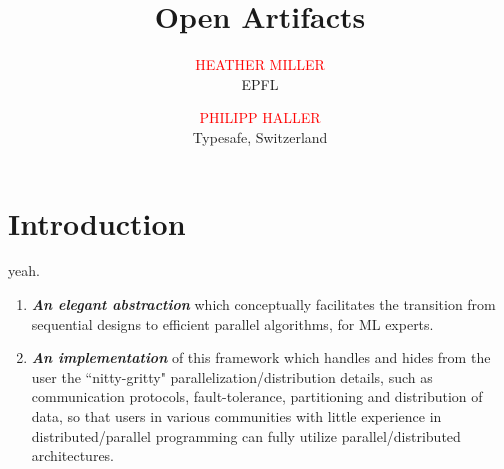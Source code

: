 \documentclass[acmtocl]{acmtrans2m}
\title{{\color{Red}Open Artifacts}}
\author{\textcolor{Red}{HEATHER MILLER}\\EPFL \and
\textcolor{Red}{PHILIPP HALLER}\\Typesafe, Switzerland}
\begin{document}
%
\maketitle


\section{Introduction}

yeah.

\begin{enumerate}

\item \textbf{\textit{An elegant abstraction}} which conceptually facilitates the transition from sequential designs to efficient parallel algorithms, for ML experts.

\item \textbf{\textit{An implementation}} of this framework which handles and hides from the user the ``nitty-gritty" parallelization/distribution details, such as communication protocols, fault-tolerance, partitioning and distribution of data, so that users in various communities with little experience in distributed/parallel programming can fully utilize parallel/distributed architectures.

\end{enumerate}




\end{document}
